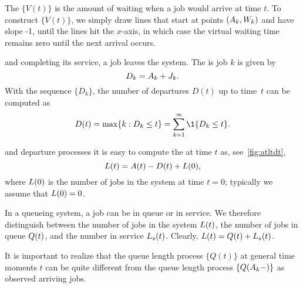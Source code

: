 

The  $\{V(t)\}$ is the amount of waiting when a job would arrive at time $t$.
To construct $\{V(t)\}$, we simply draw lines that start at points $(A_k, W_k)$ and have slope -1, until the lines hit the $x$-axis, in which case the virtual waiting time remains zero until the next arrival occurs.

 and completing its service, a job leaves the system.
The  is job $k$ is given by
\begin{equation*}
 D_k = A_{k} + J_k.
\end{equation*}
With the sequence $\{D_k\}$, the number of departures $D(t)$ up to time~$t$ can be computed as
\begin{equation*}
 D(t) = \max\{k : D_k \leq t\} = \sum_{k=1}^\infty \1{D_k \leq t}.
\end{equation*}



 and departure processes it is easy to compute the  at time $t$ as, see~\cref{fig:atltdt},
\begin{equation}\label{eq:14}
 L(t) = A(t) - D(t) + L(0),
\end{equation}
where $L(0)$ is the number of jobs in the system at time $t=0$; typically we assume that $L(0)=0$.

In a queueing system, a job can be in queue or in service.
We therefore distinguish between the number of jobs in the system $L(t)$, the number of jobs in queue $Q(t)$, and the number in service $L_s(t)$.
Clearly, $L(t) = Q(t) + L_s(t)$.

It is important to realize that the queue length process $\{Q(t)\}$ at general time moments $t$ can be quite different from the queue length process $\{ Q(A_k-)\}$ as observed arriving jobs.


